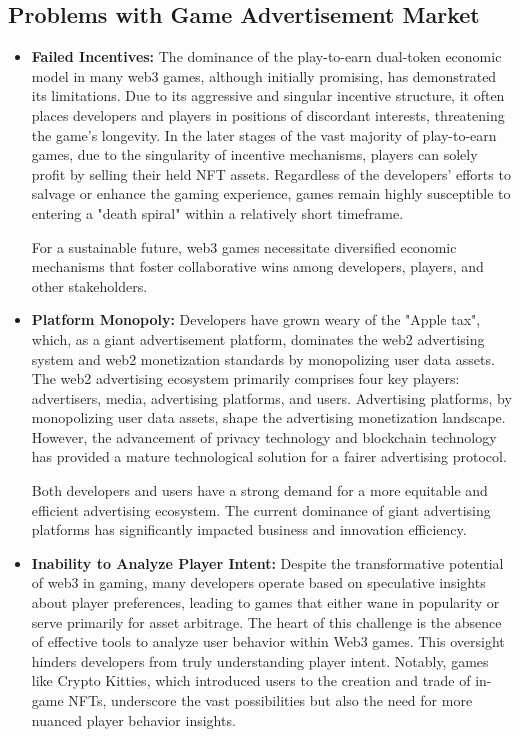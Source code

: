 \subsection{Problems with Game Advertisement Market}
\begin{itemize}[leftmargin=*]
    \item \textbf{Failed Incentives:} The dominance of the play-to-earn dual-token economic model in many web3 games, although initially promising, has demonstrated its limitations. Due to its aggressive and singular incentive structure, it often places developers and players in positions of discordant interests, threatening the game’s longevity. In the later stages of the vast majority of play-to-earn games, due to the singularity of incentive mechanisms, players can solely profit by selling their held NFT assets. Regardless of the developers’ efforts to salvage or enhance the gaming experience, games remain highly susceptible to entering a "death spiral" within a relatively short timeframe. 
    
    For a sustainable future, web3 games necessitate diversified economic mechanisms that foster collaborative wins among developers, players, and other stakeholders.
    \item \textbf{Platform Monopoly:} Developers have grown weary of the "Apple tax", which, as a giant advertisement platform, dominates the web2 advertising system and web2 monetization standards by monopolizing user data assets. The web2 advertising ecosystem primarily comprises four key players: advertisers, media, advertising platforms, and users. Advertising platforms, by monopolizing user data assets, shape the advertising monetization landscape. However, the advancement of privacy technology and blockchain technology has provided a mature technological solution for a fairer advertising protocol.
 
    Both developers and users have a strong demand for a more equitable and efficient advertising ecosystem. The current dominance of giant advertising platforms has significantly impacted business and innovation efficiency.

    \item \textbf{Inability to Analyze Player Intent:} Despite the transformative potential of web3 in gaming, many developers operate based on speculative insights about player preferences, leading to games that either wane in popularity or serve primarily for asset arbitrage. The heart of this challenge is the absence of effective tools to analyze user behavior within Web3 games. This oversight hinders developers from truly understanding player intent. Notably, games like Crypto Kitties, which introduced users to the creation and trade of in-game NFTs, underscore the vast possibilities but also the need for more nuanced player behavior insights.


\end{itemize}
